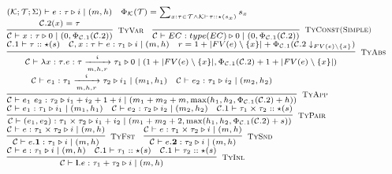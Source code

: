 \documentclass[fleqn]{article}
\begin{document}
\newcommand{\jtygc}[6]{#1 \vdash #2 : #3 \triangleright #4 \mid (#5, #6)}

\[
\scriptsize
\begin{array}{l}
	(\mathcal{K}; \mathcal{T}; \Sigma) \vdash e : \tau \triangleright i \mid (m, h) \hspace{1em}
	\Phi_{\mathcal{K}}(\mathcal{T}) = \sum_{x:\tau \in \mathcal{T} \land \mathcal{K} \vdash \tau :: \star(s_x)} s_x \\
	\infer[\textsc{TyVar}]{\jtygc{\mathcal{C}}{x}{\tau}{0}{0}{\Phi_{\mathcal{C}.1}(\mathcal{C}.2)}}{\mathcal{C}.2(x)=\tau} \hspace{1em}
	\infer[\textsc{TyConst(Simple)}]{\jtygc{\mathcal{C}}{EC}{type(EC)}{0}{0}{\Phi_{\mathcal{C}.1}(\mathcal{C}.2)}}{} \\
	\infer[\textsc{TyAbs}]{\jtygc{ \mathcal{C}}{ \lambda x:\tau. e}{ \tau \xrightarrow[m,h,r]{i} \tau_1 }{ 0 }{ 1 + |FV(e)\setminus \{ x \}| }{\Phi_{\mathcal{C}.1}(\mathcal{C}.2) + 1 + |FV(e)\setminus\{x\}|} }{\mathcal{C}.1 \vdash \tau :: \star(s) & \jtygc{\mathcal{C},x:\tau}{ e }{ \tau_1 }{ i }{ m }{h} & r = 1 + |FV(e)\setminus \{x\}| + \Phi_{\mathcal{C}.1}(\mathcal{C}.2 \downarrow_{FV(e) \setminus \{x\}})} \\
	\infer[\textsc{TyApp}]{\jtygc{\mathcal{C}} { e_1~e_2 } { \tau_2 } { i_1 + i_2 + 1 + i } { m_1 + m_2 + m }{\max(h_1,h_2,\Phi_{\mathcal{C}.1}(\mathcal{C}.2)+h)}}{\jtygc{\mathcal{C}} { e_1 }{ \tau_1 \xrightarrow[m,h,r]{i} \tau_2 }{ i_1 }{ m_1 }{h_1}& \jtygc{\mathcal{C}} { e_2 }{ \tau_1 }{ i_2 }{ m_2}{h_2}} \\
	\infer[\textsc{TyPair}]{\jtygc{\mathcal{C}}{ (e_1,e_2) }{ \tau_1 \times \tau_2 }{ i_1 + i_2 }{ m_1 + m_2 + 2}{\max(h_1,h_2,\Phi_{\mathcal{C}.1}(\mathcal{C}.2)+s)}}{\jtygc{\mathcal{C}}{  e_1 }{ \tau_1 }{ i_1 }{m_1}{h_1} & \jtygc{\mathcal{C} }{ e_2 }{ \tau_2 }{ i_2 }{ m_2}{h_2} & \mathcal{C}.1 \vdash \tau_1 \times \tau_2 :: \star(s)} \\
	\infer[\textsc{TyFst}]{\jtygc{\mathcal{C} }{ e.\mathbf{1} }{ \tau_1 }{ i }{ m}{h}}{\jtygc{\mathcal{C} }{ e }{ \tau_1 \times \tau_2 }{ i }{ m}{h}} \hspace{1em}
	\infer[\textsc{TySnd}]{\jtygc{\mathcal{C} }{ e.\mathbf{2} }{ \tau_2 }{ i }{ m}{h}}{\jtygc{\mathcal{C} }{ e }{ \tau_1 \times \tau_2 }{ i }{ m}{h}} \\
	\infer[\textsc{TyInl}]{\jtygc{\mathcal{C} }{ \mathbf{l}.e }{ \tau_1 + \tau_2 }{ i }{ m}{h}}{\jtygc{\mathcal{C} }{ e }{ \tau_1 }{ i }{ m }{h} & \mathcal{C}.1 \vdash \tau_1 :: \star(s) & \mathcal{C}.1 \vdash \tau_2 :: \star(s)} \\

\end{array}\]
\end{document}
